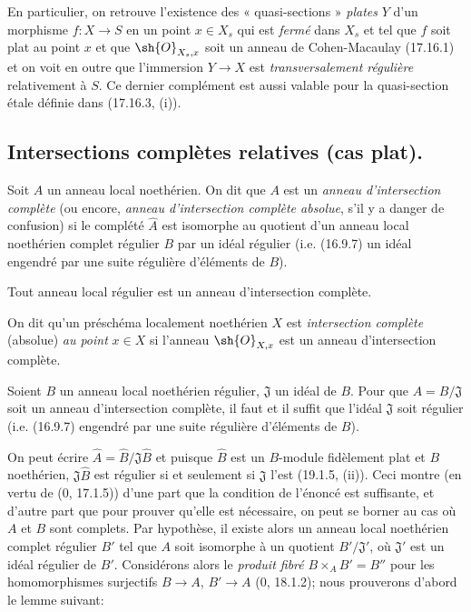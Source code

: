En particulier, on retrouve l'existence des « quasi-sections » \emph{plates} $Y$ d'un morphisme $f:X\to S$ en un point $x\in X_s$ qui est \emph{fermé} dans $X_s$ et tel que $f$ soit plat au point $x$ et que $\sh{O}_{X_s,x}$ soit un anneau de Cohen-Macaulay (17.16.1) et on voit en outre que l'immersion $Y\to X$ est \emph{transversalement régulière} relativement à $S$. Ce dernier complément est aussi valable pour la quasi-section étale définie dans (17.16.3, (i)).

\subsection{Intersections complètes relatives (cas plat).}
\label{subsection:IV.19.3}


\begin{definition}[19.3.1]
\label{IV.19.3.1}
Soit $A$ un anneau local noethérien. On dit que $A$ est un \emph{anneau d'intersection complète} (ou encore, \emph{anneau d'intersection complète absolue}, s'il y a danger de confusion) si le complété $\widehat A$ est isomorphe au quotient d'un anneau local noethérien complet régulier $B$ par un idéal régulier (i.e. (16.9.7) un idéal engendré par une suite régulière d'éléments de $B$).

Tout anneau local régulier est un anneau d'intersection complète.

On dit qu'un préschéma localement noethérien $X$ est \emph{intersection complète} (absolue) \emph{au point} $x\in X$ si l'anneau $\sh{O}_{X,x}$ est un anneau d'intersection complète.
\end{definition}

\begin{proposition}[19.3.2]
\label{IV.19.3.2}
Soient $B$ un anneau local noethérien régulier, $\mathfrak J$ un idéal de $B$. Pour que $A=B/\mathfrak J$ soit un anneau d'intersection complète, il faut et il suffit que l'idéal $\mathfrak J$ soit régulier (i.e. (16.9.7) engendré par une suite régulière d'éléments de $B$).
\end{proposition}

On peut écrire $\widehat A=\widehat B/\mathfrak J\widehat B$ et puisque $\widehat B$ est un $B$-module fidèlement plat et $B$ noethérien, $\mathfrak J\widehat B$ est régulier si et seulement si $\mathfrak J$ l'est (19.1.5, (ii)). Ceci montre (en vertu de ($0$, 17.1.5)) d'une part que la condition de l'énoncé est suffisante, et d'autre part que pour prouver qu'elle est nécessaire, on peut se borner au cas où $A$ et $B$ sont complets. Par hypothèse, il existe alors un anneau local noethérien complet régulier $B'$ tel que $A$ soit isomorphe à un quotient $B'/\mathfrak J'$, où $\mathfrak J'$ est un idéal régulier de $B'$. Considérons alors le \emph{produit fibré} $B\times_A B'=B''$ pour les homomorphismes surjectifs $B\to A$, $B'\to A$ ($0$, 18.1.2); nous prouverons d'abord le lemme suivant:

